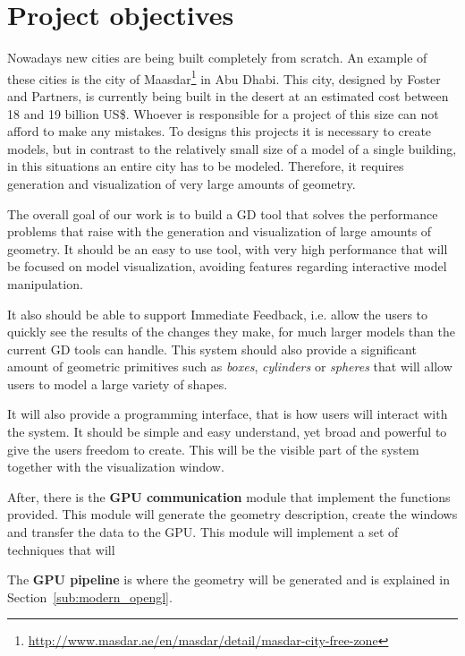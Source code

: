 
\section{Project objectives} %
\label{sec:project_objectives}


Nowadays new cities are being built  completely from scratch. An example of these cities is the city of Maasdar\footnote{\url{http://www.masdar.ae/en/masdar/detail/masdar-city-free-zone}} in Abu Dhabi. This city, designed by Foster and Partners, is currently being built in the desert at an estimated cost between 18 and 19 billion US\$. Whoever is responsible for a project of this size can not afford to make any mistakes.
To designs this projects it is necessary to create models, but in contrast to the relatively small size of a model of a single building, in this situations an entire city has to be modeled. Therefore, it requires generation and visualization of very large amounts of geometry.

The overall goal of our work is to build a GD tool that solves the performance problems that raise with the generation and visualization of large amounts of geometry. It should be an easy to use tool, with very high performance that will be focused on model visualization, avoiding features regarding interactive model manipulation.

It also should be able to support Immediate Feedback, i.e. allow the users to quickly see the results of the changes they make, for much larger models than the current GD tools can handle. This system should also provide a significant amount of geometric primitives such as \emph{boxes}, \emph{cylinders} or \emph{spheres} that will allow users to model a large variety of shapes.

It will also provide a programming interface, that is how users will interact with the system. It should be simple and easy understand, yet broad and powerful to give the users freedom to create. This will be the visible part of the system together with the visualization window.

After, there is the \textbf{GPU communication} module that implement the functions provided. This module will generate the geometry description, create the windows and transfer the data to the GPU. This module will implement a set of techniques that will 

The \textbf{GPU pipeline} is where the geometry will be generated and is explained in Section~\ref{sub:modern_opengl}.


